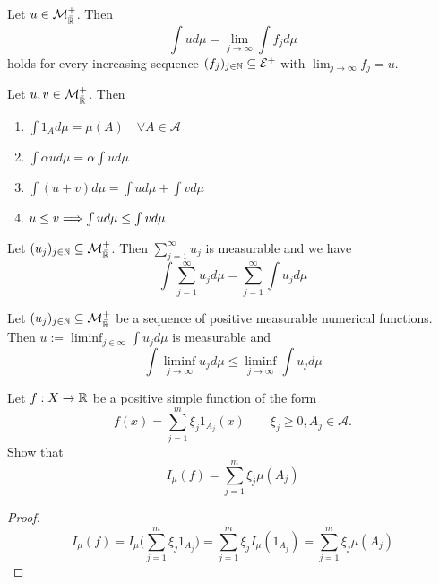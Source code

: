 \begin{thm}
Let \(u\in \mathcal{M}_{\bar{\Bbb{R}}}^+\). Then
\[
\int ud\mu  = \lim_{j\rightarrow \infty }\int f_{j}d\mu 
\]
holds for every increasing sequence \((f_{j})_{j\in \Bbb{N}}\subseteq \mathcal{E}^+\) with \(\lim_{j\rightarrow \infty }f_{j}=u\).
\end{thm}

\begin{thm}
Let \(u,v\in \mathcal{M}^+_{\bar{\Bbb{R}}}\). Then

\begin{enumerate}
  \item \(\int  1_A d\mu  = \mu (A) \quad \forall A\in \mathcal{A}\)
  \item \(\int  \alpha u d\mu  = \alpha  \int u d\mu \)
  \item \(\int (u+v)d\mu  = \int ud\mu  +\int vd\mu \)
  \item \(u\leq v\space \Longrightarrow \space \int ud\mu \leq \int vd\mu \)
\end{enumerate}
\end{thm}


\begin{thm}
Let \((u_{j})_{j\in \Bbb{N}}\subseteq \mathcal{M}^+_{\bar{\Bbb{R}}}\). Then \(\sum _{j=1}^\infty u_{j}\) is measurable and we have
\[
\int \sum _{j=1}^\infty u_{j}d\mu =\sum _{j=1}^\infty \int u_{j}d\mu 
\]
\end{thm}

\begin{thm}
Let \((u_{j})_{j\in \Bbb{N}}\subseteq \mathcal{M}^+_{\bar{\Bbb{R}}}\) be a sequence of positive measurable numerical functions. Then \(u:=\liminf_{j\in \infty }\int u_{j}d\mu \) is measurable and
\[
\int \liminf_{j\rightarrow \infty }u_{j}d\mu \leq \liminf_{j\rightarrow \infty }\int u_{j}d\mu 
\]
\end{thm}

\begin{thm}[Problem 9.1]
Let \(f:X\rightarrow \Bbb{R}\) be a positive simple function of the form
\[
f(x)=\sum _{j=1}^m \xi _{j}1_{A_{j}}(x)\qquad \xi _{j}\geq 0 , A_{j}\in \mathcal{A}.
\]
Show that
\[
I_\mu (f)=\sum _{j=1}^m\xi _{j}\mu (A_{j})
\]
\end{thm}

\begin{proof}
\[
I_\mu (f)=I_\mu \bigg(\sum _{j=1}^m \xi _{j}1_{A_{j}}\bigg)=\sum _{j=1}^m\xi _{j}I_\mu (1_{A_{j}})=\sum _{j=1}^m\xi _{j}\mu (A_{j})
\]
\end{proof}


